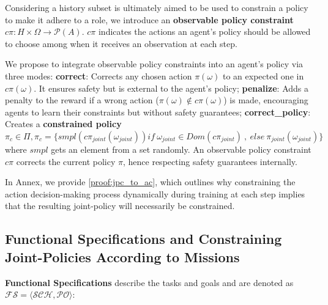 \documentclass[runningheads]{llncs}
\theoremstyle{freethm}
\theoremstyle{proofoutline}
\newcounter{proof}
\begin{document}
Considering a history subset is ultimately aimed to be used to constrain a policy to make it adhere to a role, we introduce an \textbf{observable policy constraint} $c\pi: H \times \Omega \rightarrow \mathcal{P}(A)$. $c\pi$ indicates the actions an agent's policy should be allowed to choose among when it receives an observation at each step.

%     

We propose to integrate observable policy constraints into an agent's policy via three modes:
\textbf{correct}: Corrects any chosen action $\pi(\omega)$ to an expected one in $c\pi(\omega)$. It ensures safety but is external to the agent's policy; \quad
\textbf{penalize}: Adds a penalty to the reward if a wrong action ($\pi(\omega) \notin c\pi(\omega)$) is made, encouraging agents to learn their constraints but without safety guarantees; \quad
\textbf{correct\_policy}: Creates a \textbf{constrained policy} $\pi_c \in \Pi, \pi_c = \{smpl(c\pi_{joint}(\omega_{joint})) \allowbreak if \ \omega_{joint} \in Dom(c\pi_{joint}) \ \allowbreak, \ \allowbreak else \ \allowbreak \pi_{joint}(\omega_{joint})\}$ where $smpl$ gets an element from a set randomly. An observable policy constraint $c\pi$ corrects the current policy $\pi$, hence respecting safety guarantees internally.

In Annex, we provide \autoref{proof:jpc_to_ac}, which outlines why constraining the action decision-making process dynamically during training at each step implies that the resulting joint-policy will necessarily be constrained.


\subsection{Functional Specifications and Constraining Joint-Policies According to Missions}

\textbf{Functional Specifications} describe the tasks and goals and are denoted as $\mathcal{FS} = \langle \mathcal{SCH}, \mathcal{PO} \rangle$:
\end{document}
